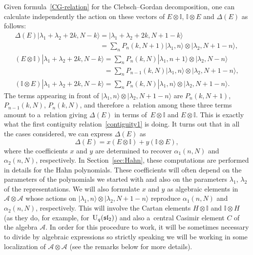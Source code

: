 \documentclass[10pt,a4paper]{amsart}
\numberwithin{equation}{section}
\theoremstyle{definition}
\begin{document}
Given formula~\eqref{CG-relation} for the Clebsch--Gordan decomposition, one can calculate independently the action on these vectors of $E\otimes \mathbb{I}$, $\mathbb{I}\otimes E$ and $\Delta(E)$ as follows:
\begin{gather*}
\Delta(E)|\lambda_1+\lambda_2+2k,N-k\rangle = |\lambda_1+\lambda_2+2k,N+1-k\rangle\\
 \phantom{\Delta(E)|\lambda_1+\lambda_2+2k,N-k\rangle }{}= \sum_{n} P_n(k,N+1)|\lambda_1,n\rangle\otimes |\lambda_2,N+1-n\rangle,\\
(E\otimes \mathbb{I})|\lambda_1+\lambda_2+2k,N-k\rangle = \sum_{n} P_n(k,N)|\lambda_1,n+1\rangle\otimes |\lambda_2,N-n\rangle\\
 \phantom{(E\otimes \mathbb{I})|\lambda_1+\lambda_2+2k,N-k\rangle}{} = \sum_{n} P_{n-1}(k,N)|\lambda_1,n\rangle\otimes |\lambda_2,N+1-n\rangle,\\
(\mathbb{I}\otimes E)|\lambda_1+\lambda_2+2k,N-k\rangle = \sum_{n} P_n(k,N)|\lambda_1,n\rangle\otimes |\lambda_2,N+1-n\rangle.
\end{gather*}
The terms appearing in front of $|\lambda_1,n\rangle\otimes |\lambda_2,N+1-n\rangle$ are
$P_n(k,N+1)$, $ P_{n-1}(k,N)$, $ P_n(k,N)$,
and therefore a~relation among these three terms amount to a~relation giving $\Delta(E)$ in terms of~${E\otimes \mathbb{I}}$ and $E\otimes \mathbb{I}$. This is exactly what the first contiguity relation~\eqref{contiguity1} is doing. It turns out that in all the cases considered, we can express $\Delta(E)$ as
\[\Delta(E)=x(E\otimes \mathbb{I})+y(\mathbb{I}\otimes E),\]
where the coefficients $x$ and $y$ are determined to recover $\alpha_1(n,N)$ and $\alpha_2(n,N)$, respectively.
In Section~\ref{sec:Hahn}, these computations are performed in details for the Hahn polynomials.
These coefficients will often depend on the parameters of the polynomials we started with and also on the parameters $\lambda_1$, $\lambda_2$ of the representations. We will also formulate $x$ and $y$ as algebraic elements in $\mathcal{A}\otimes \mathcal{A}$ whose actions on $|\lambda_1,n\rangle\otimes |\lambda_2,N+1-n\rangle$ reproduce $\alpha_1(n,N)$ and $\alpha_2(n,N)$, respectively. This will involve the Cartan elements $H\otimes \mathbb{I}$ and $\mathbb{I}\otimes H$ (as they do, for example, for~${\rm U}_q(\mathfrak{sl}_2)$) and also a~central Casimir element $C$ of the algebra $\mathcal{A}$. In order for this procedure to work, it will be sometimes necessary to divide by algebraic expressions so strictly speaking we will be working in some localization of $\mathcal{A}\otimes \mathcal{A}$ (see the remarks below for more details).
\end{document}
